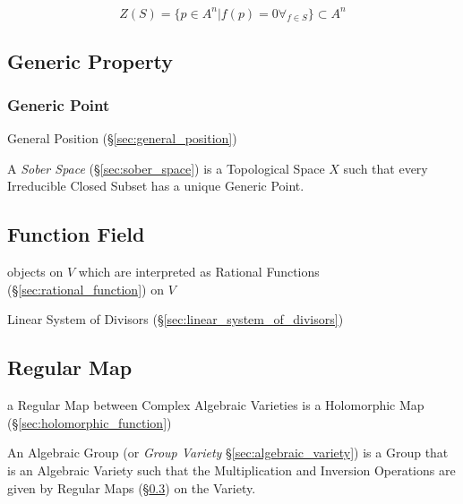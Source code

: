 \[
  Z(S) = \{ p \in A^n | f(p) = 0 \forall_{f \in S} \} \subset A^n
\]



\subsection{Generic Property}\label{sec:generic_property}

\subsubsection{Generic Point}\label{sec:generic_point}

\fist General Position (\S\ref{sec:general_position})

\fist A \emph{Sober Space} (\S\ref{sec:sober_space}) is a Topological Space $X$
such that every Irreducible Closed Subset has a unique Generic Point.



\subsection{Function Field}\label{sec:function_field}

objects on $V$ which are interpreted as Rational Functions
(\S\ref{sec:rational_function}) on $V$

\fist Linear System of Divisors (\S\ref{sec:linear_system_of_divisors})



\subsection{Regular Map}\label{sec:regular_map}

a Regular Map between Complex Algebraic Varieties is a Holomorphic Map
(\S\ref{sec:holomorphic_function})

An Algebraic Group (or \emph{Group Variety} \S\ref{sec:algebraic_variety}) is a
Group that is an Algebraic Variety such that the Multiplication and Inversion
Operations are given by Regular Maps (\S\ref{sec:regular_map}) on the Variety.



